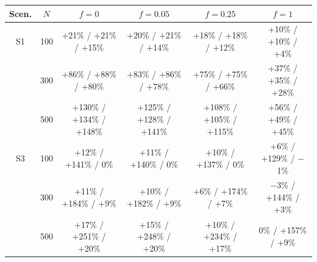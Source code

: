 \begin{tabular}{cc cccc}
\toprule
Scen. & $N$ & $f=0$ & $f=0.05$ & $f=0.25$ & $f=1$ \\
\midrule
S1 & 100 & +21\% / +21\% / +15\% & +20\% / +21\% / +14\% & +18\% / +18\% / +12\% & +10\% / +10\% / +4\% \\
 & 300 & +86\% / +88\% / +80\% & +83\% / +86\% / +78\% & +75\% / +75\% / +66\% & +37\% / +35\% / +28\% \\
 & 500 & +130\% / +134\% / +148\% & +125\% / +128\% / +141\% & +108\% / +105\% / +115\% & +56\% / +49\% / +45\% \\
\midrule
S3 & 100 & +12\% / +141\% / 0\% & +11\% / +140\% / 0\% & +10\% / +137\% / 0\% & +6\% / +129\% / $-$1\% \\
 & 300 & +11\% / +184\% / +9\% & +10\% / +182\% / +9\% & +6\% / +174\% / +7\% & $-$3\% / +144\% / +3\% \\
 & 500 & +17\% / +251\% / +20\% & +15\% / +248\% / +20\% & +10\% / +234\% / +17\% & 0\% / +157\% / +9\% \\
\bottomrule
\end{tabular}
